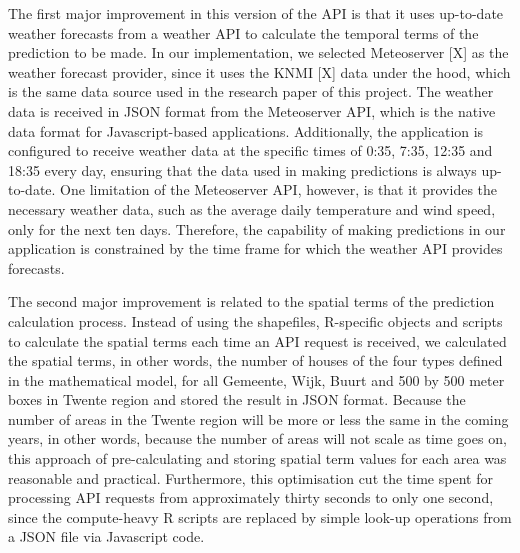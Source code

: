 \documentclass{utitcphd_overleaf}
\begin{document}
The first major improvement in this version of the API is that it uses up-to-date weather forecasts from a weather API to calculate the temporal terms of the prediction to be made. In our implementation, we selected Meteoserver [X] as the weather forecast provider, since it uses the KNMI [X] data under the hood, which is the same data source used in the research paper of this project. The weather data is received in JSON format from the Meteoserver API, which is the native data format for Javascript-based applications. Additionally, the application is configured to receive weather data at the specific times of 0:35, 7:35, 12:35 and 18:35 every day, ensuring that the data used in making predictions is always up-to-date. One limitation of the Meteoserver API, however, is that it provides the necessary weather data, such as the average daily temperature and wind speed, only for the next ten days. Therefore, the capability of making predictions in our application is constrained by the time frame for which the weather API provides forecasts.

The second major improvement is related to the spatial terms of the prediction calculation process. Instead of using the shapefiles, R-specific objects and scripts to calculate the spatial terms each time an API request is received, we calculated the spatial terms, in other words, the number of houses of the four types defined in the mathematical model, for all Gemeente, Wijk, Buurt and 500 by 500 meter boxes in Twente region and stored the result in JSON format. Because the number of areas in the Twente region will be more or less the same in the coming years, in other words, because the number of areas will not scale as time goes on, this approach of pre-calculating and storing spatial term values for each area was reasonable and practical. Furthermore, this optimisation cut the time spent for processing API requests from approximately thirty seconds to only one second, since the compute-heavy R scripts are replaced by simple look-up operations from a JSON file via Javascript code.
\end{document}
